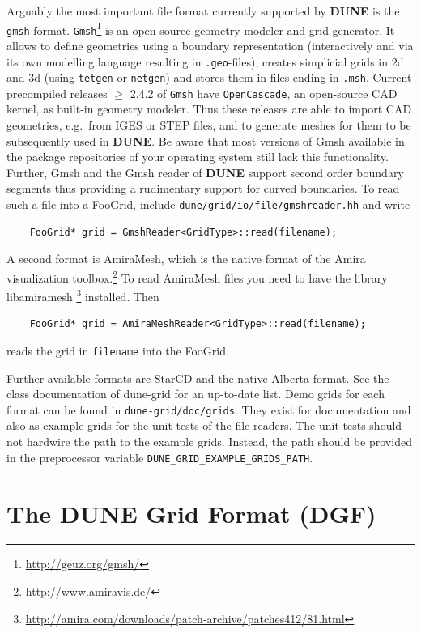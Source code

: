 \documentclass[11pt,a4paper,headinclude,footinclude,DIV16,normalheadings]{scrreprt}
\newcommand{\Dune}{{\sf\bfseries DUNE}\xspace}
\begin{document}
Arguably the most important file format currently supported by \Dune is
the \lstinline!gmsh! format.  \lstinline!Gmsh!\footnote{\url{http://geuz.org/gmsh/}}
is an open-source geometry modeler and grid generator.  It allows to define
geometries using a boundary representation (interactively and via its
own modelling language resulting in \lstinline!.geo!-files), 
creates simplicial grids in 2d and 3d (using
\lstinline!tetgen! or \lstinline!netgen!)
and stores them in files ending in \lstinline!.msh!. Current precompiled
releases $\geq$ 2.4.2 of \lstinline!Gmsh! have \lstinline!OpenCascade!, an open-source CAD
kernel, as built-in geometry modeler. Thus these releases are able to import 
CAD geometries, e.g.\ from IGES or STEP files, and to generate meshes for them to
be subsequently used in \Dune. Be aware that most versions of Gmsh available in
the package repositories of your operating system still lack this functionality.
Further, Gmsh and the Gmsh reader of \Dune support second order
boundary segments thus providing a rudimentary support for curved boundaries.
To read such a file into a FooGrid, include \lstinline!dune/grid/io/file/gmshreader.hh!
and write
\begin{lstlisting}
    FooGrid* grid = GmshReader<GridType>::read(filename);
\end{lstlisting}

A second format is AmiraMesh, which is the native format of the Amira
visualization toolbox.\footnote{\url{http://www.amiravis.de/}}
To read AmiraMesh files you need to have the library libamiramesh%
\footnote{\url{http://amira.com/downloads/patch-archive/patches412/81.html}}
installed.  Then
\begin{lstlisting}
    FooGrid* grid = AmiraMeshReader<GridType>::read(filename);
\end{lstlisting}
reads the grid in \lstinline!filename! into the FooGrid.

Further available formats are StarCD and the native Alberta format.
See the class documentation of dune-grid for an up-to-date list.
Demo grids for each format can be found in \lstinline!dune-grid/doc/grids!.
They exist for documentation and also as example grids for the unit
tests of the file readers.  The unit tests should not hardwire the path
to the example grids.  Instead, the path should be provided in the preprocessor
variable \lstinline!DUNE_GRID_EXAMPLE_GRIDS_PATH!.


\section{The \texorpdfstring{\Dune}{Dune} Grid Format (DGF)}
\end{document}
